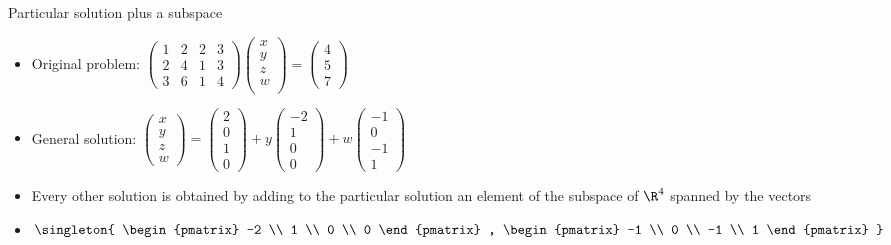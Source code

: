 \documentclass{beamer}
\begin{document}
\begin{frame}{Particular solution plus a subspace}

\begin{itemize}
\item
Original problem: $
\begin{pmatrix}
1 & 2 & 2 & 3 \\
2 & 4 & 1 & 3 \\
3 & 6 & 1 & 4
\end{pmatrix}
\begin{pmatrix}
x \\
y \\
z \\
w \\
\end{pmatrix}
=
\begin{pmatrix}
4 \\
5 \\
7
\end{pmatrix}
$
\item
General solution: $
\begin{pmatrix}
x \\ y \\ z \\ w
\end{pmatrix}
=
\begin{pmatrix}
2 \\
0 \\
1 \\
0
\end{pmatrix}
+
y
\begin{pmatrix}
-2 \\
1 \\
0 \\
0
\end{pmatrix}
+
w
\begin{pmatrix}
-1 \\
0 \\
-1 \\
1
\end{pmatrix}
$
\item Every other solution is obtained by adding to the particular solution an element of the subspace of $\R^4$ spanned by the vectors
\item
$
\singleton{
\begin{pmatrix}
-2 \\
1 \\
0 \\
0
\end{pmatrix}
,
\begin{pmatrix}
-1 \\
0 \\
-1 \\
1
\end{pmatrix}
}
$

\end{itemize}
\end{frame}
\end{document}

